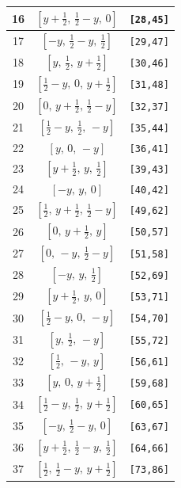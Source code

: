 \documentclass[fleqn,8pt]{jsarticle}
\begin{document}
\begin{longtable}{ccc}
16 & $\left[ y + \frac{1}{2},\, \frac{1}{2} - y,\, 0 \right]$ & {\tt [28,45]} \\ \hline
17 & $\left[ - y,\, \frac{1}{2} - y,\, \frac{1}{2} \right]$ & {\tt [29,47]} \\ \hline
18 & $\left[ y,\, \frac{1}{2},\, y + \frac{1}{2} \right]$ & {\tt [30,46]} \\ \hline
19 & $\left[ \frac{1}{2} - y,\, 0,\, y + \frac{1}{2} \right]$ & {\tt [31,48]} \\ \hline
20 & $\left[ 0,\, y + \frac{1}{2},\, \frac{1}{2} - y \right]$ & {\tt [32,37]} \\ \hline
21 & $\left[ \frac{1}{2} - y,\, \frac{1}{2},\, - y \right]$ & {\tt [35,44]} \\ \hline
22 & $\left[ y,\, 0,\, - y \right]$ & {\tt [36,41]} \\ \hline
23 & $\left[ y + \frac{1}{2},\, y,\, \frac{1}{2} \right]$ & {\tt [39,43]} \\ \hline
24 & $\left[ - y,\, y,\, 0 \right]$ & {\tt [40,42]} \\ \hline
25 & $\left[ \frac{1}{2},\, y + \frac{1}{2},\, \frac{1}{2} - y \right]$ & {\tt [49,62]} \\ \hline
26 & $\left[ 0,\, y + \frac{1}{2},\, y \right]$ & {\tt [50,57]} \\ \hline
27 & $\left[ 0,\, - y,\, \frac{1}{2} - y \right]$ & {\tt [51,58]} \\ \hline
28 & $\left[ - y,\, y,\, \frac{1}{2} \right]$ & {\tt [52,69]} \\ \hline
29 & $\left[ y + \frac{1}{2},\, y,\, 0 \right]$ & {\tt [53,71]} \\ \hline
30 & $\left[ \frac{1}{2} - y,\, 0,\, - y \right]$ & {\tt [54,70]} \\ \hline
31 & $\left[ y,\, \frac{1}{2},\, - y \right]$ & {\tt [55,72]} \\ \hline
32 & $\left[ \frac{1}{2},\, - y,\, y \right]$ & {\tt [56,61]} \\ \hline
33 & $\left[ y,\, 0,\, y + \frac{1}{2} \right]$ & {\tt [59,68]} \\ \hline
34 & $\left[ \frac{1}{2} - y,\, \frac{1}{2},\, y + \frac{1}{2} \right]$ & {\tt [60,65]} \\ \hline
35 & $\left[ - y,\, \frac{1}{2} - y,\, 0 \right]$ & {\tt [63,67]} \\ \hline
36 & $\left[ y + \frac{1}{2},\, \frac{1}{2} - y,\, \frac{1}{2} \right]$ & {\tt [64,66]} \\ \hline
37 & $\left[ \frac{1}{2},\, \frac{1}{2} - y,\, y + \frac{1}{2} \right]$ & {\tt [73,86]} \\ \hline

\end{longtable}
\end{document}

